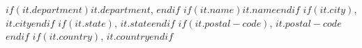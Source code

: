 $if(it.department)$$it.department$, $endif$%
$if(it.name)$$it.name$$endif$%
$if(it.city)$, $it.city$$endif$%
$if(it.state)$, $it.state$$endif$%
$if(it.postal-code)$, $it.postal-code$$endif$%
$if(it.country)$, $it.country$$endif$
